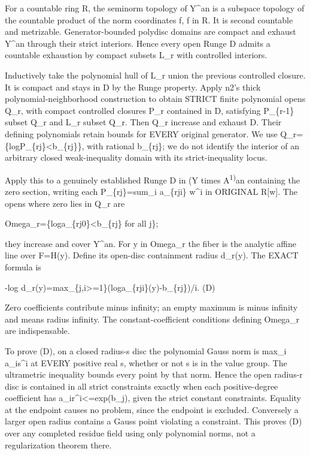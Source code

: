 \documentclass[
  10pt,
]{article}
\begin{document}
For a countable ring R, the seminorm topology of Y\^{}an is a subspace
topology of the countable product of the norm coordinates
\textbar f\textbar, f in R. It is second countable and metrizable.
Generator-bounded polydisc domains are compact and exhaust Y\^{}an
through their strict interiors. Hence every open Runge D admits a
countable exhaustion by compact subsets L\_r with controlled interiors.

Inductively take the polynomial hull of L\_r union the previous
controlled closure. It is compact and stays in D by the Runge property.
Apply n2's thick polynomial-neighborhood construction to obtain STRICT
finite polynomial opens Q\_r, with compact controlled closures P\_r
contained in D, satisfying P\_\{r-1\} subset Q\_r and L\_r subset Q\_r.
Then Q\_r increase and exhaust D. Their defining polynomials retain
bounds for EVERY original generator. We use
Q\_r=\{log\textbar P\_\{rj\}\textbar\textless b\_\{rj\}\}, with rational
b\_\{rj\}; we do not identify the interior of an arbitrary closed
weak-inequality domain with its strict-inequality locus.

Apply this to a genuinely established Runge D in (Y times
A\textsuperscript{1)}an containing the zero section, writing each
P\_\{rj\}=sum\_i a\_\{rji\} w\^{}i in ORIGINAL R{[}w{]}. The opens where
zero lies in Q\_r are

Omega\_r=\{log\textbar a\_\{rj0\}\textbar\textless b\_\{rj\} for all
j\};

they increase and cover Y\^{}an. For y in Omega\_r the fiber is the
analytic affine line over F=H(y). Define its open-disc containment
radius d\_r(y). The EXACT formula is

-log
d\_r(y)=max\_\{j,i\textgreater=1\}(log\textbar a\_\{rji\}(y)\textbar-b\_\{rj\})/i.
(D)

Zero coefficients contribute minus infinity; an empty maximum is minus
infinity and means radius infinity. The constant-coefficient conditions
defining Omega\_r are indispensable.

To prove (D), on a closed radius-s disc the polynomial Gauss norm is
max\_i \textbar a\_i\textbar s\^{}i at EVERY positive real s, whether or
not s is in the value group. The ultrametric inequality bounds every
point by that norm. Hence the open radius-r disc is contained in all
strict constraints exactly when each positive-degree coefficient has
\textbar a\_i\textbar r\^{}i\textless=exp(b\_j), given the strict
constant constraints. Equality at the endpoint causes no problem, since
the endpoint is excluded. Conversely a larger open radius contains a
Gauss point violating a constraint. This proves (D) over any completed
residue field using only polynomial norms, not a regularization theorem
there.
\end{document}
